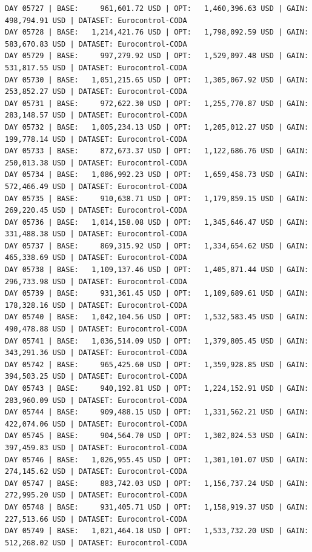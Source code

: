 \documentclass[11pt,a4paper]{article}
\begin{document}
\begin{verbatim}
DAY 05727 | BASE:     961,601.72 USD | OPT:   1,460,396.63 USD | GAIN: 498,794.91 USD | DATASET: Eurocontrol-CODA
DAY 05728 | BASE:   1,214,421.76 USD | OPT:   1,798,092.59 USD | GAIN: 583,670.83 USD | DATASET: Eurocontrol-CODA
DAY 05729 | BASE:     997,279.92 USD | OPT:   1,529,097.48 USD | GAIN: 531,817.55 USD | DATASET: Eurocontrol-CODA
DAY 05730 | BASE:   1,051,215.65 USD | OPT:   1,305,067.92 USD | GAIN: 253,852.27 USD | DATASET: Eurocontrol-CODA
DAY 05731 | BASE:     972,622.30 USD | OPT:   1,255,770.87 USD | GAIN: 283,148.57 USD | DATASET: Eurocontrol-CODA
DAY 05732 | BASE:   1,005,234.13 USD | OPT:   1,205,012.27 USD | GAIN: 199,778.14 USD | DATASET: Eurocontrol-CODA
DAY 05733 | BASE:     872,673.37 USD | OPT:   1,122,686.76 USD | GAIN: 250,013.38 USD | DATASET: Eurocontrol-CODA
DAY 05734 | BASE:   1,086,992.23 USD | OPT:   1,659,458.73 USD | GAIN: 572,466.49 USD | DATASET: Eurocontrol-CODA
DAY 05735 | BASE:     910,638.71 USD | OPT:   1,179,859.15 USD | GAIN: 269,220.45 USD | DATASET: Eurocontrol-CODA
DAY 05736 | BASE:   1,014,158.08 USD | OPT:   1,345,646.47 USD | GAIN: 331,488.38 USD | DATASET: Eurocontrol-CODA
DAY 05737 | BASE:     869,315.92 USD | OPT:   1,334,654.62 USD | GAIN: 465,338.69 USD | DATASET: Eurocontrol-CODA
DAY 05738 | BASE:   1,109,137.46 USD | OPT:   1,405,871.44 USD | GAIN: 296,733.98 USD | DATASET: Eurocontrol-CODA
DAY 05739 | BASE:     931,361.45 USD | OPT:   1,109,689.61 USD | GAIN: 178,328.16 USD | DATASET: Eurocontrol-CODA
DAY 05740 | BASE:   1,042,104.56 USD | OPT:   1,532,583.45 USD | GAIN: 490,478.88 USD | DATASET: Eurocontrol-CODA
DAY 05741 | BASE:   1,036,514.09 USD | OPT:   1,379,805.45 USD | GAIN: 343,291.36 USD | DATASET: Eurocontrol-CODA
DAY 05742 | BASE:     965,425.60 USD | OPT:   1,359,928.85 USD | GAIN: 394,503.25 USD | DATASET: Eurocontrol-CODA
DAY 05743 | BASE:     940,192.81 USD | OPT:   1,224,152.91 USD | GAIN: 283,960.09 USD | DATASET: Eurocontrol-CODA
DAY 05744 | BASE:     909,488.15 USD | OPT:   1,331,562.21 USD | GAIN: 422,074.06 USD | DATASET: Eurocontrol-CODA
DAY 05745 | BASE:     904,564.70 USD | OPT:   1,302,024.53 USD | GAIN: 397,459.83 USD | DATASET: Eurocontrol-CODA
DAY 05746 | BASE:   1,026,955.45 USD | OPT:   1,301,101.07 USD | GAIN: 274,145.62 USD | DATASET: Eurocontrol-CODA
DAY 05747 | BASE:     883,742.03 USD | OPT:   1,156,737.24 USD | GAIN: 272,995.20 USD | DATASET: Eurocontrol-CODA
DAY 05748 | BASE:     931,405.71 USD | OPT:   1,158,919.37 USD | GAIN: 227,513.66 USD | DATASET: Eurocontrol-CODA
DAY 05749 | BASE:   1,021,464.18 USD | OPT:   1,533,732.20 USD | GAIN: 512,268.02 USD | DATASET: Eurocontrol-CODA

\end{verbatim}
\end{document}
